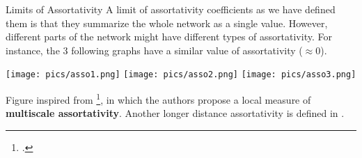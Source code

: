 \begin{textbox}{Limits of Assortativity}
    A limit of assortativity coefficients as we have defined them is that they summarize the whole network as a single value. However, different parts of the network might have different types of assortativity. For instance, the 3 following graphs have a similar value of assortativity ($\approx 0$).

    \centering

    \texttt{[image: pics/asso1.png]}
    \texttt{[image: pics/asso2.png]}
    \texttt{[image: pics/asso3.png]}

    Figure inspired from \footcite{peel2018multiscale}, in which the authors propose a local measure of \textbf{multiscale assortativity}. Another longer distance assortativity is defined in .
\end{textbox}




